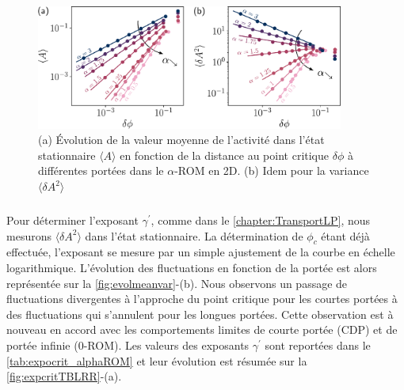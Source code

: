 \begin{figure}[h]
	\centering
	\includegraphics[width=0.9\textwidth]{Chapitre3/Figures/BetaGamma/EvolMeanVar_edited.pdf}
	\caption{(a) Évolution de la valeur moyenne de l'activité dans l'état stationnaire $\langle A \rangle$ en fonction de la distance au point critique $\delta\phi$ à différentes portées dans le $\alpha$-ROM en 2D. (b) Idem pour la variance $\langle \delta A^2 \rangle$}
	\label{fig:evolmeanvar}
\end{figure}

\subparagraph{}Pour déterminer l'exposant $\gamma^\prime$, comme dans le \autoref{chapter:TransportLP}, nous mesurons $\langle \delta A^2\rangle$ dans l'état stationnaire. La détermination de $\phi_c$ étant déjà effectuée, l'exposant se mesure par un simple ajustement de la courbe en échelle logarithmique. L'évolution des fluctuations en fonction de la portée est alors représentée sur la \autoref{fig:evolmeanvar}-(b). Nous observons un passage de fluctuations divergentes à l'approche du point critique pour les courtes portées à des fluctuations qui s'annulent pour les longues portées. Cette observation est à nouveau en accord avec les comportements limites de courte portée (CDP) et de portée infinie ($0$-ROM). Les valeurs des exposants $\gamma^\prime$ sont reportées dans le \autoref{tab:expocrit_alphaROM} et leur évolution est résumée sur la \autoref{fig:expcritTBLRR}-(a).

